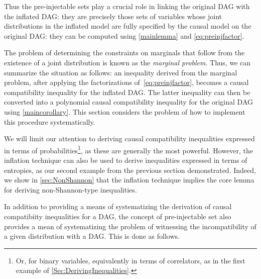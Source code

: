 {Thus the pre-injectable sets play a crucial role in linking the original DAG with the inflated DAG: they are precisely those sets of variables whose joint distributions in the inflated model are fully specified by the causal model on the original DAG: they can be computed using \cref{mainlemma} and \cref{eq:preinjfactor}. 

The problem of determining the constraints on marginals that follow from the existence of a joint distribution is known as the {\em marginal problem}. Thus, we can summarize the situation as follows: an inequality derived from the marginal problem, after applying the factorizations of~\cref{eq:preinjfactor}, becomes a causal compatibility inequality for the inflated DAG. The latter inequality can then be converted into a polynomial causal compatibility inequality for the original DAG using \cref{maincorollary}.
This section considers the problem of how to implement this procedure systematically.

We will limit our attention to deriving causal compatibility inequalities expressed in terms of probabilities\footnote{Or, for binary variables, equivalently in terms of correlators, as in the first example of \cref{Sec:DerivingInequalities}.}, as these are generally the most powerful. However, the inflation technique can also be used to derive inequalities expressed in terms of entropies, as our second example from the previous section demonstrated. Indeed, we show in \cref{sec:NonShannon} that the inflation technique implies the core lemma for deriving non-Shannon-type inequalities.


In addition to providing a means of systematizing the derivation of causal compatibiity inequalities for a DAG, the concept of pre-injectable set also provides a mean of systematizing the problem of witnessing the incompatibility of a given distribution with a DAG.  This is done as follows.

}

